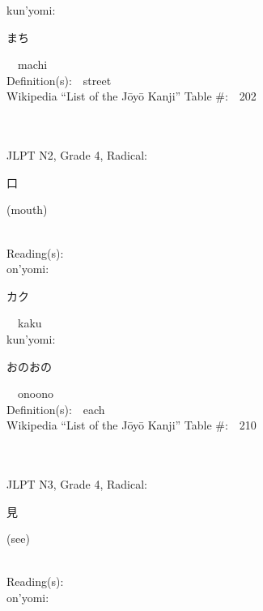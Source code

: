 \begin{multicols}{2}
{\hspace*{1em}}kun'yomi:\ \ \\
{\hspace*{2em}}{\begin{CJK}{UTF8}{min} まち \end{CJK}}\ \ machi\ \ \\
Definition(s):\ \ street \\
Wikipedia ``List of the J\=oy\=o Kanji'' Table \#:\ \ 202 \\
\ \ \\
{\fontsize{34pt}{40pt}  }\ \ \\  %
{JLPT N2, Grade 4, Radical:\ \ {\begin{CJK}{UTF8}{min} 口 \end{CJK}} (mouth) } \\
Reading(s):\ \ \\
{\hspace*{1em}}on'yomi:\ \ \\
{\hspace*{2em}}{\begin{CJK}{UTF8}{min} カク \end{CJK}}\ \ kaku\ \ \\
{\hspace*{1em}}kun'yomi:\ \ \\
{\hspace*{2em}}{\begin{CJK}{UTF8}{min} おのおの \end{CJK}}\ \ onoono\ \ \\
Definition(s):\ \ each \\
Wikipedia ``List of the J\=oy\=o Kanji'' Table \#:\ \ 210 \\
\ \ \\
{\fontsize{34pt}{40pt}  }\ \ \\  %
{JLPT N3, Grade 4, Radical:\ \ {\begin{CJK}{UTF8}{min} 見 \end{CJK}} (see) } \\
Reading(s):\ \ \\
{\hspace*{1em}}on'yomi:\ \ \\

\end{multicols}

